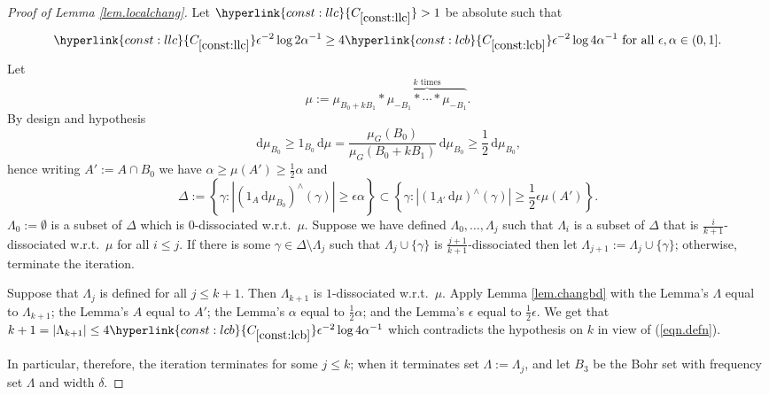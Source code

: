 \documentclass[12pt,reqno]{amsart}
\newcommand{\dd}{\,\mathrm{d}}
\numberwithin{equation}{section}
\newcommand{\refconstbig}[1]{%
    \hyperlink{const:#1}{C_{\ref{const:#1}}}%
}
\begin{document}
\begin{proof}[Proof of Lemma \ref{lem.localchang}]
Let $\refconstbig{llc}>1$ be absolute such that
\begin{equation}\label{eqn.defn}
\refconstbig{llc}\epsilon^{-2}\log 2\alpha^{-1} \geq 4\refconstbig{lcb}\epsilon^{-2}\log 4\alpha^{-1}\text{ for all }\epsilon ,\alpha\in (0,1].
\end{equation}
 Let
\begin{equation*}
\mu:=\mu_{{B_0}+kB_1} \ast \overbrace{\mu_{-B_1} \ast \cdots \ast \mu_{-B_1}}^{k \text{ times}}.
\end{equation*}
By design and hypothesis
\begin{equation*}
\dd\mu_{B_0} \geq 1_{B_0}\dd\mu  = \frac{\mu_G({B_0})}{\mu_G({B_0}+kB_1)}\dd\mu_{B_0} \geq \frac{1}{2}\dd\mu_{B_0},
\end{equation*}
hence writing $A':=A \cap {B_0}$ we have $\alpha \geq \mu(A') \geq \frac{1}{2}\alpha$ and
\begin{equation*}
\Delta:=\left\{\gamma:|(1_A\dd\mu_{B_0})^{\wedge}(\gamma)| \geq \epsilon \alpha\right\} \subset \left\{\gamma : |(1_{A'}\dd\mu)^\wedge(\gamma)| \geq \frac{1}{2}\epsilon \mu(A')\right\}.
\end{equation*}
$\Lambda_0:=\emptyset$ is a subset of $\Delta$ which is $0$-dissociated w.r.t.\ $\mu$. Suppose we have defined $\Lambda_0,\dots,\Lambda_j$ such that $\Lambda_i$ is a subset of $\Delta$ that is $\frac{i}{k+1}$-dissociated w.r.t.\ $\mu$ for all $i \leq j$. If there is some $\gamma \in \Delta\setminus \Lambda_j$ such that $\Lambda_j \cup \{\gamma\}$ is $\frac{j+1}{k+1}$-dissociated then let $\Lambda_{j+1}:=\Lambda_j \cup \{\gamma\}$; otherwise, terminate the iteration. 

Suppose that $\Lambda_j$ is defined for all $j \leq k+1$. Then $\Lambda_{k+1}$ is $1$-dissociated w.r.t.\ $\mu$. Apply Lemma \ref{lem.changbd} with the Lemma's $\Lambda$ equal to $\Lambda_{k+1}$; the Lemma's $A$ equal to $A'$; the Lemma's $\alpha$ equal to $\frac{1}{2}\alpha$; and the Lemma's $\epsilon$ equal to $\frac{1}{2}\epsilon$. We get that  $k+1=|\Lambda_{k+1}| \leq 4\refconstbig{lcb}\epsilon^{-2}\log 4\alpha^{-1}$ which contradicts the hypothesis on $k$ in view of (\ref{eqn.defn}).

In particular, therefore, the iteration terminates for some $j\leq k$; when it terminates set $\Lambda:=\Lambda_j$, and let $B_3$ be the Bohr set with frequency set $\Lambda$ and width $\delta$.


\end{proof}
\end{document}

